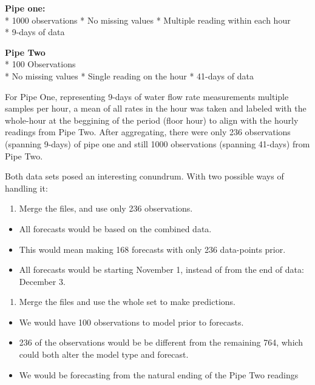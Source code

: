 \documentclass[openany]{book}
\providecommand{\tightlist}{%
  \setlength{\itemsep}{0pt}\setlength{\parskip}{0pt}}
\begin{document}
\textbf{Pipe one:}\\
* 1000 observations * No missing values * Multiple reading within each
hour\\
* 9-days of data

\textbf{Pipe Two}\\
* 100 Observations\\
* No missing values * Single reading on the hour * 41-days of data

For Pipe One, representing 9-days of water flow rate measurements
multiple samples per hour, a mean of all rates in the hour was taken and
labeled with the whole-hour at the beggining of the period (floor hour)
to align with the hourly readings from Pipe Two. After aggregating,
there were only 236 observations (spanning 9-days) of pipe one and still
1000 observations (spanning 41-days) from Pipe Two.

Both data sets posed an interesting conundrum. With two possible ways of
handling it:

\begin{enumerate}
\def\labelenumi{\arabic{enumi}.}
\tightlist
\item
  Merge the files, and use only 236 observations.
\end{enumerate}

\begin{itemize}
\tightlist
\item
  All forecasts would be based on the combined data.
\item
  This would mean making 168 forecasts with only 236 data-points prior.
\item
  All forecasts would be starting November 1, instead of from the end of
  data: December 3.\\
\end{itemize}

\begin{enumerate}
\def\labelenumi{\arabic{enumi}.}
\setcounter{enumi}{1}
\tightlist
\item
  Merge the files and use the whole set to make predictions.\\
\end{enumerate}

\begin{itemize}
\tightlist
\item
  We would have 100 observations to model prior to forecasts.
\item
  236 of the observations would be be different from the remaining 764,
  which could both alter the model type and forecast.
\item
  We would be forecasting from the natural ending of the Pipe Two
  readings
\end{itemize}
\end{document}
